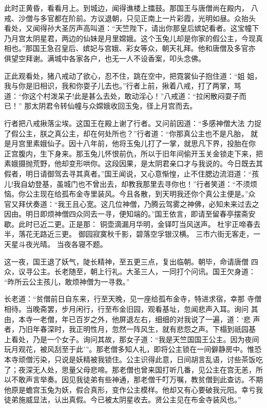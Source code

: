 此时正黄昏，看看月上。到城边，闻得谯楼上擂鼓。那国王与唐僧尚在殿内，
八戒、沙僧与多官都在阶前。方议退朝，只见正南上一片彩霞，光明如昼。众抬头
看处，又闻得孙大圣厉声高叫道：“天竺陛下，请出你那皇后嫔妃看者。这宝幢下
乃月宫太阴星君，两边的仙妹是月里嫦娥。这个玉兔儿却是你家的假公主，今现真
相也。”那国王急召皇后、嫔妃与宫娥、彩女等众，朝天礼拜。他和唐僧及多官亦
俱望空拜谢。满城中各家各户，也无一人不设香案，叩头念佛。

正此观看处，猪八戒动了欲心，忍不住，跳在空中，把霓裳仙子抱住道：“姐
姐，我与你是旧相识，我和你耍子儿去也。”行者上前，揪着八戒，打了两掌，骂
道：“你这个村泼呆子!此是甚么去处，敢动淫心！”八戒道：“拉闲散闷耍子而已！”
那太阴君令转仙幢与众嫦娥收回玉兔，径上月宫而去。

行者把八戒揪落尘埃。这国王在殿上谢了行者。又问前因道：“多感神僧大法
力捉了假公主，朕之真公主，却在何处所也？”行者道：“你那真公主也不是凡胎，
就是月宫里素娥仙子。因十八年前，他将玉兔儿打了一掌，就思凡下界，投胎在你
正宫腹内，生下身来。那玉兔儿怀恨前仇，所以于旧年间偷开玉关金锁走下来，把
素娥摄抛荒野，他却变形哄你。这段因果，是太阴君亲口才与我说的。今日既去其
假者，明日请御驾去寻其真者。”国王闻说，又心意惭惶，止不住腮边流泪道：“孩
儿!我自幼登基，虽城门也不曾出去，却教我那里去寻你也！”行者笑道：“不须烦
恼。你公主现在给孤布金寺里装风。今且各散，到天明我还你个真公主便是。”众
官又拜伏奏道：“我王且心宽。这几位神僧，乃腾云驾雾之神佛，必知未来过去之
因由。明日即烦神僧四众同去一寻，便知端的。”国王依言，即请至留春亭摆斋安
歇。此时已近二更。正是那：
铜壶滴漏月华明，金铎叮当风送声。
杜宇正啼春去半，落花无路近三更。
御园寂寞秋千影，碧落空孚银汉横。
三市六街无客走，一天星斗夜光晴。
当夜各寝不题。

这一夜，国王退了妖气，陡长精神，至五更三点，复出临朝。朝毕，命请唐僧
四众，议寻公主。长老随至，朝上行礼。大圣三人，一同打个问讯。国王欠身道：
“昨所云公主孩儿，敢烦神僧为一寻救。”

长老道：“贫僧前日自东来，行至天晚，见一座给孤布金寺，特进求宿，幸那
寺僧相待。当晚斋罢，步月闲行，行至布金旧园，观看基址，忽闻悲声入耳。询问
其由，本寺一老僧，年已百岁之外，他屏退左右，细细的对我说了一遍，道：‘悲
声者，乃旧年春深时，我正明性月，忽然一阵风生，就有悲怨之声。下榻到祇园基
上看处，乃是一个女子。询问其故，那女子道：“我是天竺国国王公主。因为夜间
玩月观花，被风刮至于此’”。那老僧多知人礼，即将公主锁在一间僻静房中。惟恐
本寺顽僧污染，只说是妖精被我锁住。公主识得此意，日间胡言乱语，讨些茶饭吃
了；夜深无人处，思量父母悲啼。那老僧也曾来国打听几番，见公主在宫无恙，所
以不敢声言举奏。因见我徒弟有些神通，那老僧千叮万嘱，教贫僧到此查访。不期
他原是蟾宫玉兔为妖，假合真形，变作公主模样。他却又有心要破我元阳。幸亏我
徒弟施威显法，认出真假。今已被太阴星收去。贤公主见在布金寺装风也。”

